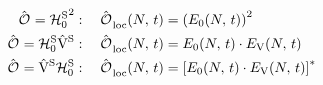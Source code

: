 \begin{equation}
    \label{eq:simple-variance-terms}
    \begin{split}
        \ObservableOp ={\HzeroHamiltonian[\schroedingerPicture]}^2   &: \quad \localObservable{N}{t} =
        \left(E_0(N,\,t)\right)^2
        \\
        \ObservableOp =\HzeroHamiltonian[\schroedingerPicture]\Vhamiltonian[\schroedingerPicture]   &: \quad \localObservable{N}{t} = E_0(N,\,t) \cdot E_\text{V}(N,\,t)
        \\
        \ObservableOp =\Vhamiltonian[\schroedingerPicture]\HzeroHamiltonian[\schroedingerPicture]   &: \quad \localObservable{N}{t} = \left[E_0(N,\,t) \cdot E_\text{V}(N,\,t) \right]^\ast
    \end{split}
\end{equation}